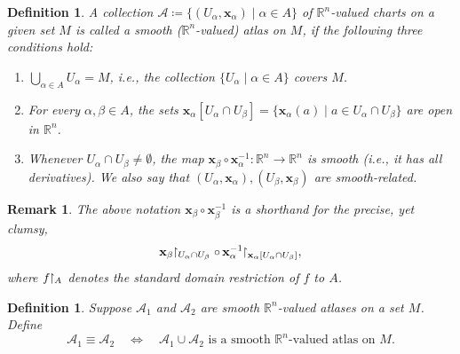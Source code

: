 \documentclass[11pt,a4paper,twoside,openany]{report}
\theoremstyle{my-theorem}
\theoremstyle{non-theorem}
\newtheorem{definition}[theorem]{Definition}
\newtheorem{remark}[theorem]{Remark}
\begin{document}
		\begin{definition}
			\label{def:smooth-atlas}
			A collection $\mathcal A \coloneqq \{(U_\alpha, \mathbf x_\alpha) \mid \alpha \in A\}$ of $\mathbb R^n$-valued charts on a given set $M$ is called a \emph{smooth} ($\mathbb R^n$-\emph{valued}) \emph{atlas} on $M$, if the following three conditions hold:
			\begin{enumerate}[label=\rm(\alph*)]
				\item $\bigcup_{\alpha \in A} U_\alpha = M$, i.e., the collection $\{U_\alpha \mid \alpha \in A\}$ covers $M$.
				\item For every $\alpha, \beta \in A$, the sets $\mathbf x_\alpha[U_\alpha \cap U_\beta] = \{\mathbf x_\alpha(a) \mid a \in U_\alpha \cap U_\beta\}$ are open in $\mathbb R^n$.
				\item Whenever $U_\alpha \cap U_\beta \neq \emptyset$, the map $\mathbf x_\beta \circ \mathbf x_\alpha^{-1}: \mathbb R^n \to \mathbb R^n$ is smooth (i.e., it has all derivatives). We also say that $(U_\alpha, \mathbf x_\alpha), (U_\beta, \mathbf x_\beta)$ are \emph{smooth-related}.
			\end{enumerate}
		\end{definition}
		
		\begin{remark}
			The above notation $\mathbf x_\beta \circ \mathbf x_\beta^{-1}$ is a shorthand for the precise, yet clumsy,
			\begin{equation*}
				\mathbf x_\beta \!\!\upharpoonright_{U_\alpha \cap U_\beta} \circ \, \mathbf x_\alpha^{-1} \!\!\upharpoonright_{\mathbf x_{\alpha}[U_\alpha \cap U_\beta]},
			\end{equation*}
			where $f \!\!\upharpoonright_A$ denotes the standard domain restriction of $f$ to $A$.
		\end{remark}
	
		\begin{definition}
			Suppose $\mathcal A_1$ and $\mathcal A_2$ are smooth $\mathbb R^n$-valued atlases on a set $M$. Define
			\begin{equation*}
				\mathcal A_1 \equiv \mathcal A_2 \quad \Longleftrightarrow \quad \text{$\mathcal A_1 \cup \mathcal A_2$ is a smooth $\mathbb R^n$-valued atlas on $M$}.
			\end{equation*}
		\end{definition}
	
\end{document}
